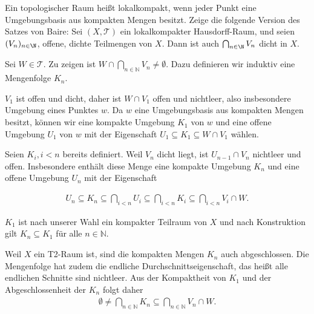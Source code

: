 \begin{exercise}
Ein topologischer Raum heißt lokalkompakt, wenn jeder Punkt eine Umgebungsbasis
aus kompakten Mengen besitzt. Zeige die folgende Version des Satzes von Baire:
Sei $(X,\mathcal{T})$ ein lokalkompakter Hausdorff-Raum, und seien $(V_n)_{n \in \N}$,
offene, dichte Teilmengen von $X$. Dann ist auch $\bigcap_{n \in \N} V_n$ dicht in $X$.
\end{exercise}
\begin{solution}
  Sei $W \in \mathcal{T}.$ Zu zeigen ist $W \cap \bigcap_{n \in \mathbb{N}} V_n \neq \emptyset.$ Dazu definieren wir induktiv eine Mengenfolge $K_n$.

  $V_1$ ist offen und dicht, daher ist $W \cap V_1$ offen und nichtleer, also insbesondere Umgebung eines Punktes $w$. Da $w$ eine Umgebungsbasis aus kompakten Mengen besitzt, können wir eine kompakte Umgebung $K_1$ von $w$ und eine offene Umgebung $U_1$ von $w$ mit der Eigenschaft $U_1 \subseteq K_1 \subseteq W \cap V_1$ wählen.

  Seien $K_i, i < n$ bereits definiert. Weil $V_n$ dicht liegt, ist $U_{n-1} \cap V_n$ nichtleer und offen. Insbesondere enthält diese Menge eine kompakte Umgebung $K_n$ und eine offene Umgebung $U_n$ mit der Eigenschaft

  \begin{align}
      U_n \subseteq K_n \subseteq \bigcap_{i < n} U_i
      \subseteq \bigcap_{i < n} K_i \subseteq \bigcap_{i < n} V_i \cap W.
  \end{align}

  $K_1$ ist nach unserer Wahl ein kompakter Teilraum von $X$ und nach Konstruktion gilt $K_n \subseteq K_1$ für alle $n \in \mathbb{N}$.

  Weil $X$ ein T2-Raum ist, sind die kompakten Mengen $K_n$ auch abgeschlossen. Die Mengenfolge hat zudem die endliche Durchschnittseigenschaft, das heißt alle endlichen Schnitte sind nichtleer. Aus der Kompaktheit von $K_1$ und der Abgeschlossenheit der $K_n$ folgt daher
  \begin{align}
      \emptyset \neq \bigcap_{n \in \mathbb{N}} K_n \subseteq \bigcap_{n \in \mathbb{N}} V_n \cap W.
  \end{align}
\end{solution}
